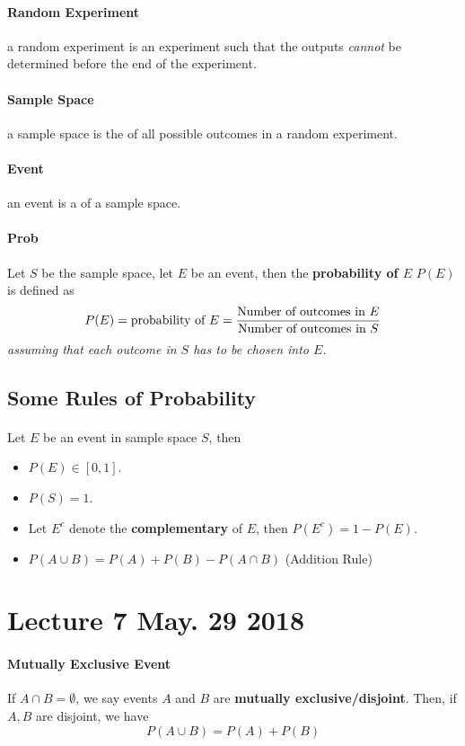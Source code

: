 \documentclass{article}
\begin{document}
		\paragraph{Random Experiment} a random experiment is an experiment such that the outputs \emph{cannot} be determined  before the end of the experiment.
		\paragraph{Sample Space} a sample space is the  of all possible outcomes in a random experiment.
		\paragraph{Event} an event is a  of a sample space.
		\paragraph{Prob} Let $S$ be the sample space, let $E$ be an event, then the \textbf{probability of $E$} $P(E)$ is defined as
			\[
				P(E) = \text{{probability of $E$}} = \frac{\text{{Number of outcomes in $E$}}}{\text{{Number of outcomes in $S$}}}
			\]
			\emph{assuming that each outcome in $S$ has  to be chosen into $E$.}
			
		\subsection{Some Rules of Probability}
		\paragraph{} Let $E$ be an event in sample space $S$, then
		\begin{itemize}
			\item $P(E) \in [0, 1]$.
			\item $P(S) = 1$.
			\item Let $E^c$ denote the \textbf{complementary} of $E$, then $P(E^c) = 1 - P(E)$.
			\item $P(A \cup B) = P(A) + P(B) - P(A \cap B)$ (Addition Rule)
		\end{itemize}
		
	\section{Lecture 7 May. 29 2018}
		\paragraph{Mutually Exclusive Event} If $A\cap B = \emptyset$, we say events $A$ and $B$ are \textbf{mutually exclusive/disjoint}. Then, if $A,B$ are disjoint, we have 
			\[
				P(A\cup B) = P(A) + P(B)
			\]
			
\end{document}
